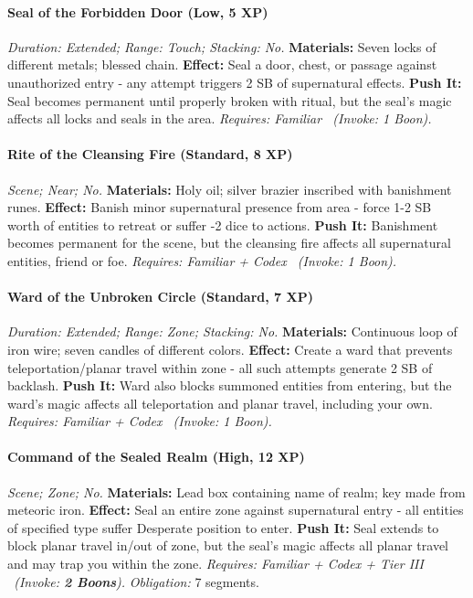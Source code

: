 \paragraph{Seal of the Forbidden Door (Low, 5 XP)} \emph{Duration: Extended; Range: Touch; Stacking: No.}
\textbf{Materials:} Seven locks of different metals; blessed chain.
\textbf{Effect:} Seal a door, chest, or passage against unauthorized entry - any attempt triggers 2 SB of supernatural effects.
\textbf{Push It:} Seal becomes permanent until properly broken with ritual, but the seal's magic affects all locks and seals in the area.
\emph{Requires: Familiar \ (\textit{Invoke:} 1 Boon).}
\paragraph{Rite of the Cleansing Fire (Standard, 8 XP)} \emph{Scene; Near; No.}
\textbf{Materials:} Holy oil; silver brazier inscribed with banishment runes.
\textbf{Effect:} Banish minor supernatural presence from area - force 1-2 SB worth of entities to retreat or suffer -2 dice to actions.
\textbf{Push It:} Banishment becomes permanent for the scene, but the cleansing fire affects all supernatural entities, friend or foe.
\emph{Requires: Familiar + Codex \ (\textit{Invoke:} 1 Boon).}
\paragraph{Ward of the Unbroken Circle (Standard, 7 XP)} \emph{Duration: Extended; Range: Zone; Stacking: No.}
\textbf{Materials:} Continuous loop of iron wire; seven candles of different colors.
\textbf{Effect:} Create a ward that prevents teleportation/planar travel within zone - all such attempts generate 2 SB of backlash.
\textbf{Push It:} Ward also blocks summoned entities from entering, but the ward's magic affects all teleportation and planar travel, including your own.
\emph{Requires: Familiar + Codex \ (\textit{Invoke:} 1 Boon).}
\paragraph{Command of the Sealed Realm (High, 12 XP)} \emph{Scene; Zone; No.}
\textbf{Materials:} Lead box containing name of realm; key made from meteoric iron.
\textbf{Effect:} Seal an entire zone against supernatural entry - all entities of specified type suffer Desperate position to enter.
\textbf{Push It:} Seal extends to block planar travel in/out of zone, but the seal's magic affects all planar travel and may trap you within the zone.
\emph{Requires: Familiar + Codex + Tier III \ (\textit{Invoke:} \textbf{2 Boons}).}
\emph{Obligation:} 7 segments.


